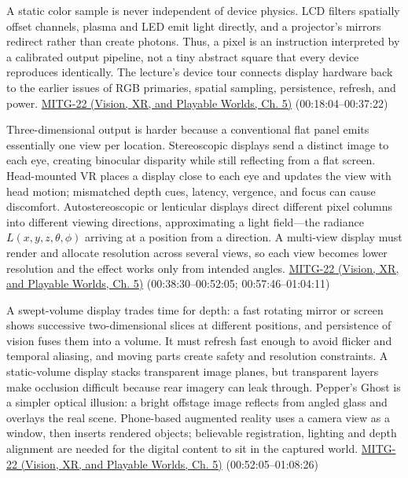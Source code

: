 A static color sample is never independent of device physics. LCD filters spatially offset channels, plasma and LED emit light directly, and a projector's mirrors redirect rather than create photons. Thus, a pixel is an instruction interpreted by a calibrated output pipeline, not a tiny abstract square that every device reproduces identically. The lecture's device tour connects display hardware back to the earlier issues of RGB primaries, spatial sampling, persistence, refresh, and power. \href{../07-Vision-XR-and-Playable-Worlds/main.pdf\#nameddest=04-visual-computing-ii-ch036-mitg-22---output-devices}{MITG-22 (Vision, XR, and Playable Worlds, Ch. 5)} (00:18:04--00:37:22)

Three-dimensional output is harder because a conventional flat panel emits essentially one view per location. Stereoscopic displays send a distinct image to each eye, creating binocular disparity while still reflecting from a flat screen. Head-mounted VR places a display close to each eye and updates the view with head motion; mismatched depth cues, latency, vergence, and focus can cause discomfort. Autostereoscopic or lenticular displays direct different pixel columns into different viewing directions, approximating a light field---the radiance \(L(x,y,z,\theta,\phi)\) arriving at a position from a direction. A multi-view display must render and allocate resolution across several views, so each view becomes lower resolution and the effect works only from intended angles. \href{../07-Vision-XR-and-Playable-Worlds/main.pdf\#nameddest=04-visual-computing-ii-ch036-mitg-22---output-devices}{MITG-22 (Vision, XR, and Playable Worlds, Ch. 5)} (00:38:30--00:52:05; 00:57:46--01:04:11)

A swept-volume display trades time for depth: a fast rotating mirror or screen shows successive two-dimensional slices at different positions, and persistence of vision fuses them into a volume. It must refresh fast enough to avoid flicker and temporal aliasing, and moving parts create safety and resolution constraints. A static-volume display stacks transparent image planes, but transparent layers make occlusion difficult because rear imagery can leak through. Pepper's Ghost is a simpler optical illusion: a bright offstage image reflects from angled glass and overlays the real scene. Phone-based augmented reality uses a camera view as a window, then inserts rendered objects; believable registration, lighting and depth alignment are needed for the digital content to sit in the captured world. \href{../07-Vision-XR-and-Playable-Worlds/main.pdf\#nameddest=04-visual-computing-ii-ch036-mitg-22---output-devices}{MITG-22 (Vision, XR, and Playable Worlds, Ch. 5)} (00:52:05--01:08:26)

